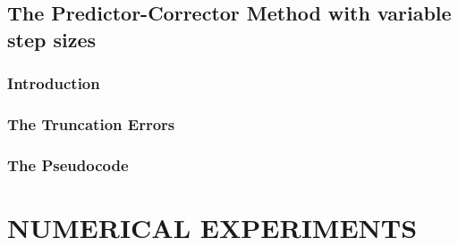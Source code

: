 \documentclass[12pt,oneside]{book}
\begin{document}
	\section{The Predictor-Corrector Method with variable step sizes} \label{m:abpcvs}
		\begin{spacing}{1.2}
			
			\subsection{Introduction}
			
			
			\subsection{The Truncation Errors}
			
			
			\subsection{The Pseudocode}
			
		\end{spacing}
		






	\chapter{NUMERICAL EXPERIMENTS}
	
	
	

	\backmatter
	
	\renewcommand{\bibname}{REFERENCES}
	
	
\end{document}
